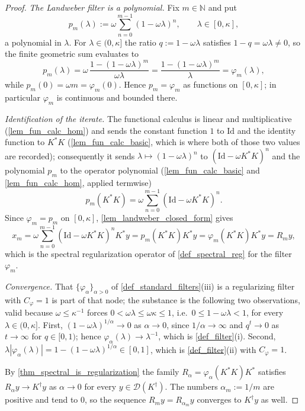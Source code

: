 \documentclass[a4paper]{report}
\theoremstyle{plain}
\theoremstyle{definition}
\theoremstyle{remark}
\newcommand{\Dom}{\mathcal{D}}
\newcommand{\Id}{\mathrm{Id}}
\newcommand{\dg}{^{\dagger}}
\begin{document}
\begin{proof}
  \emph{The Landweber filter is a polynomial.}  Fix $m \in \mathbb{N}$ and put
  \[
    p_m(\lambda) := \omega \sum_{n=0}^{m-1}(1-\omega\lambda)^{n},
    \qquad \lambda \in [0,\kappa] ,
  \]
  a polynomial in $\lambda$.  For $\lambda \in (0,\kappa]$ the ratio $q := 1-\omega\lambda$
  satisfies $1 - q = \omega\lambda \ne 0$, so the finite geometric sum evaluates to
  \[
    p_m(\lambda) = \omega\,\frac{1 - (1-\omega\lambda)^{m}}{\omega\lambda}
      = \frac{1 - (1-\omega\lambda)^{m}}{\lambda} = \varphi_m(\lambda) ,
  \]
  while $p_m(0) = \omega m = \varphi_m(0)$.  Hence $p_m = \varphi_m$ as functions on
  $[0,\kappa]$; in particular $\varphi_m$ is continuous and bounded there.

  \emph{Identification of the iterate.}  The functional calculus is linear and
  multiplicative (\cref{lem_fun_calc_hom}) and sends the constant function $1$ to $\Id$ and
  the identity function to $K^{*}K$ (\cref{lem_fun_calc_basic}, which is where both of
  those two values are recorded); consequently it sends
  $\lambda \mapsto (1-\omega\lambda)^{n}$ to $(\Id - \omega K^{*}K)^{n}$ and the
  polynomial $p_m$ to the operator polynomial (\cref{lem_fun_calc_basic} and
  \cref{lem_fun_calc_hom}, applied termwise)
  \[
    p_m(K^{*}K) = \omega \sum_{n=0}^{m-1}(\Id - \omega K^{*}K)^{n} .
  \]
  Since $\varphi_m = p_m$ on $[0,\kappa]$, \cref{lem_landweber_closed_form} gives
  \[
    x_m = \omega \sum_{n=0}^{m-1}(\Id - \omega K^{*}K)^{n}K^{*}y
      = p_m(K^{*}K)K^{*}y = \varphi_m(K^{*}K)K^{*}y = R_m y ,
  \]
  which is the spectral regularization operator of \cref{def_spectral_reg} for the filter
  $\varphi_m$.

  \emph{Convergence.}  That $\{\varphi_{\alpha}\}_{\alpha>0}$ of
  \cref{def_standard_filters}(iii) is a regularizing filter with $C_{\varphi} = 1$ is part
  of that node; the substance is the following two observations, valid because
  $\omega \le \kappa^{-1}$ forces $0 < \omega\lambda \le \omega\kappa \le 1$, i.e.\
  $0 \le 1 - \omega\lambda < 1$, for every $\lambda \in (0,\kappa]$.  First,
  $(1-\omega\lambda)^{1/\alpha} \to 0$ as $\alpha \to 0$, since $1/\alpha \to \infty$ and
  $q^{t} \to 0$ as $t \to \infty$ for $q \in [0,1)$; hence
  $\varphi_{\alpha}(\lambda) \to \lambda^{-1}$, which is \cref{def_filter}(i).  Second,
  $\lambda|\varphi_{\alpha}(\lambda)| = 1 - (1-\omega\lambda)^{1/\alpha} \in [0,1]$, which
  is \cref{def_filter}(ii) with $C_{\varphi} = 1$.

  By \cref{thm_spectral_is_regularization} the family $R_{\alpha} =
  \varphi_{\alpha}(K^{*}K)K^{*}$ satisfies $R_{\alpha}y \to K\dg y$ as $\alpha \to 0$ for
  every $y \in \Dom(K\dg)$.  The numbers $\alpha_m := 1/m$ are positive and tend to $0$,
  so the sequence $R_m y = R_{\alpha_m}y$ converges to $K\dg y$ as well.
\end{proof}
\end{document}
